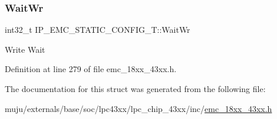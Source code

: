 \subsubsection{\texorpdfstring{Wait\+Wr}{WaitWr}}
{\footnotesize\ttfamily int32\+\_\+t I\+P\+\_\+\+E\+M\+C\+\_\+\+S\+T\+A\+T\+I\+C\+\_\+\+C\+O\+N\+F\+I\+G\+\_\+\+T\+::\+Wait\+Wr}

Write Wait 

Definition at line 279 of file emc\+\_\+18xx\+\_\+43xx.\+h.



The documentation for this struct was generated from the following file\+:\begin{DoxyCompactItemize}
\item 
muju/externals/base/soc/lpc43xx/lpc\+\_\+chip\+\_\+43xx/inc/\hyperlink{emc__18xx__43xx_8h}{emc\+\_\+18xx\+\_\+43xx.\+h}\end{DoxyCompactItemize}
